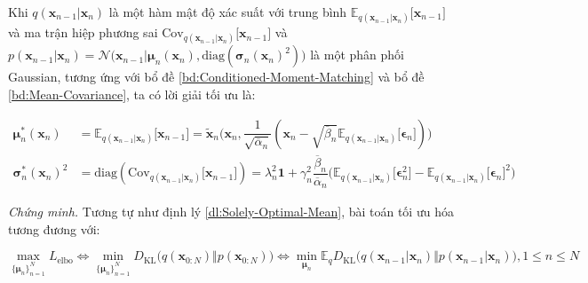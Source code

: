 \documentclass[14pt, a4paper]{article}
\numberwithin{equation}{section}
\numberwithin{figure}{section}
\numberwithin{dl}{section}
\numberwithin{md}{section}
\numberwithin{bd}{section}
\numberwithin{dn}{section}
\numberwithin{hq}{section}
\begin{document}
    Khi $q(\boldsymbol{x}_{n-1} \vert \boldsymbol{x}_n)$ là một hàm mật độ xác suất với trung bình $\mathbb{E}_{q(\boldsymbol{x}_{n-1} \vert \boldsymbol{x}_n)} \lbrack \boldsymbol{x}_{n-1} \rbrack$ và ma trận hiệp phương sai $\mathrm{Cov}_{q(\boldsymbol{x}_{n-1} \vert \boldsymbol{x}_n)} \lbrack \boldsymbol{x}_{n-1} \rbrack$ và $p(\boldsymbol{x}_{n-1} \vert \boldsymbol{x}_n) = \mathcal{N}\big( \boldsymbol{x}_{n-1} \vert \boldsymbol{\mu}_n (\boldsymbol{x}_n), \mathrm{diag} (\boldsymbol{\sigma}_n(\boldsymbol{x}_n)^2)\big)$ là một phân phối Gaussian, tương ứng với bổ đề \ref{bd:Conditioned-Moment-Matching} và bổ đề \ref{bd:Mean-Covariance}, ta có lời giải tối ưu là:

    \begin{equation}
        \begin{aligned}
            \boldsymbol{\mu}_n^{\ast} (\boldsymbol{x}_n) &= \mathbb{E}_{q(\boldsymbol{x}_{n-1} \vert \boldsymbol{x}_n)} \lbrack \boldsymbol{x}_{n-1} \rbrack = \tilde{\boldsymbol{x}}_n \big(\boldsymbol{x}_n, \dfrac{1}{\sqrt{\overline{\alpha}_n}} (\boldsymbol{x}_n - \sqrt{\overline{\beta}_n} \mathbb{E}_{q(\boldsymbol{x}_{n-1} \vert \boldsymbol{x}_n)} \lbrack \boldsymbol{\epsilon}_n \rbrack )\big) \\
            \boldsymbol{\sigma}_n^{\ast} (\boldsymbol{x}_n)^2 &= \mathrm{diag} (\mathrm{Cov}_{q(\boldsymbol{x}_{n-1} \vert \boldsymbol{x}_n)} \lbrack \boldsymbol{x}_{n-1} \rbrack) = \lambda_n^2 \boldsymbol{1} + \gamma_n^2 \dfrac{\overline{\beta}_n}{\overline{\alpha}_n} \big( \mathbb{E}_{q(\boldsymbol{x}_{n-1} \vert \boldsymbol{x}_n)} \lbrack \boldsymbol{\epsilon}_n^2 \rbrack - \mathbb{E}_{q(\boldsymbol{x}_{n-1} \vert \boldsymbol{x}_n)} \lbrack \boldsymbol{\epsilon}_n \rbrack^2 )
        \end{aligned}
    \end{equation}

    \mean*

    \textit{Chứng minh.}
    Tương tự như định lý \ref{dl:Solely-Optimal-Mean}, bài toán tối ưu hóa tương đương với:

    \begin{equation}
        \max_{\lbrace \boldsymbol{\mu}_n \rbrace_{n=1}^N} L_{\mathrm{elbo}} \Leftrightarrow \min_{\lbrace \boldsymbol{\mu}_n \rbrace_{n=1}^N} D_{\mathrm{KL}} \big(q(\boldsymbol{x}_{0:N}) \Vert p(\boldsymbol{x}_{0:N}) \big) \Leftrightarrow \min_{\boldsymbol{\mu}_n} \mathbb{E}_q D_{\mathrm{KL}} \big( q(\boldsymbol{x}_{n-1} \vert \boldsymbol{x}_n) \Vert p(\boldsymbol{x}_{n-1} \vert \boldsymbol{x}_n) \big), 1 \leq n \leq N
    \end{equation}
\end{document}
